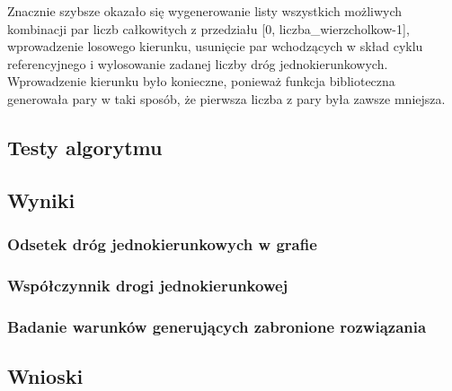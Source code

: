 \documentclass{article}
\begin{document}
Znacznie szybsze okazało się wygenerowanie listy wszystkich możliwych kombinacji par liczb całkowitych z przedziału [0, liczba\_wierzcholkow-1], wprowadzenie losowego kierunku, usunięcie par wchodzących w skład cyklu referencyjnego i wylosowanie zadanej liczby dróg jednokierunkowych. Wprowadzenie kierunku było konieczne, ponieważ funkcja biblioteczna generowała pary w taki sposób, że pierwsza liczba z pary była zawsze mniejsza.



%



\subsection{Testy algorytmu}
\label{ss_testy}

\subsection{Wyniki}
\label{ss_wyniki}

\subsubsection{Odsetek dróg jednokierunkowych w grafie}

\subsubsection{Współczynnik drogi jednokierunkowej}

\subsubsection{Badanie warunków generujących zabronione rozwiązania}

\subsection{Wnioski}
\label{ss_wnioski} 
\end{document}
